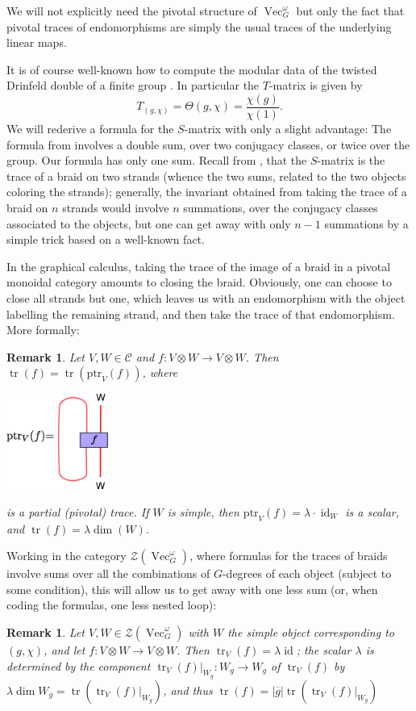 \documentclass[11pt]{book}
\theoremstyle{Rem}
\newtheorem{Rem}[theorem]{Remark}
\theoremstyle{definition}
\numberwithin{equation}{section}
\newcommand\tr{\operatorname{tr}}
\newcommand\ptr{\text{ptr}}
\newcommand\id{\operatorname{id}}
\newcommand\ot{\otimes}
\newcommand\Vect{\operatorname{Vec}}
\newcommand\C{\mathcal C}
\newcommand\CTR{\mathcal Z}
\begin{document}
We will not explicitly need the pivotal structure of $\Vect^\omega_G$ but only the fact that pivotal traces of endomorphisms are simply the usual traces of the underlying linear maps.

It is of course well-known how to compute the modular data of the twisted Drinfeld double of a finite group \cite{Coste2000FiniteGM}. In particular the $T$-matrix is given by
\begin{equation}
  \label{eq:tmatrix}
  T_{(g,\chi)}=\Theta(g,\chi)=\frac{\chi(g)}{\chi(1)}.
\end{equation}
We will rederive a formula for the $S$-matrix with only a slight advantage: The formula from \cite{Coste2000FiniteGM} involves a double sum, over two conjugacy classes, or twice over the group. Our formula has only one sum. Recall from \cite{Coste2000FiniteGM}, that the $S$-matrix is the trace of a braid on two strands (whence the two sums, related to the two objects coloring the strands); generally, the invariant obtained from taking the trace of a braid on $n$ strands would involve $n$ summations, over the conjugacy classes associated to the objects, but one can get away with only $n-1$ summations by a simple trick based on a well-known fact.

In the graphical calculus, taking the trace of the image of a braid in a pivotal monoidal category amounts to closing the braid. Obviously, one can choose to close all strands but one, which leaves us with an endomorphism with the object labelling the remaining strand, and then take the trace of that endomorphism. More formally:
\begin{Rem}\label{pretrick}\rm
  Let $V,W\in\C$ and $f\colon V\ot W\to V\ot W$. Then
  $\tr(f)=\tr(\ptr_V(f))$, where
\begin{center}
\includegraphics[width=0.25\textwidth]{ptr.eps}
\end{center}
  is a partial (pivotal) trace. If $W$ is simple, then $\ptr_V(f)=\lambda\cdot\id_W$ is a scalar, and $\tr(f)=\lambda\dim(W)$.
\end{Rem}

Working in the category $\CTR(\Vect_G^\omega)$, where formulas for the traces of braids involve sums over all the combinations of $G$-degrees of each object (subject to some condition), this will allow us to get away with one less sum (or, when coding the formulas, one less nested loop):
\begin{Rem}\label{trick}
  Let $V,W\in\CTR(\Vect_G^\omega)$ with $W$ the simple object corresponding to $(g,\chi)$, and let $f\colon V\ot W\to V\ot W$. Then $\tr_V(f)=\lambda\id$; the scalar $\lambda$ is determined by the component $\tr_V(f)|_{W_g}\colon W_g\to W_g$ of $\tr_V(f)$ by $\lambda\dim W_g=\tr(\tr_V(f)|_{W_g})$, and thus $\tr(f)=|\overline g|\tr(\tr_V(f)|_{W_g})$
\end{Rem}
\end{document}
